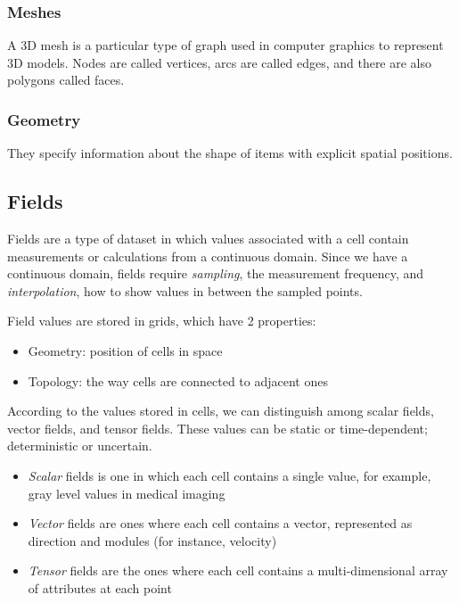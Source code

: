 \subsubsection{Meshes}
A 3D mesh is a particular type of graph used in computer graphics to represent 3D models. Nodes are called vertices, arcs are called edges, and there are also polygons called faces.

\subsubsection{Geometry}
They specify information about the shape of items with explicit spatial positions. 

\subsection{Fields}
Fields are a type of dataset in which values associated with a cell contain measurements or calculations from a continuous domain. Since we have a continuous domain, fields require \emph{sampling}, the measurement frequency, and \emph{interpolation}, how to show values in between the sampled points. \par
Field values are stored in grids, which have 2 properties:

\begin{itemize}[noitemsep]
    \item Geometry: position of cells in space
    \item Topology: the way cells are connected to adjacent ones
\end{itemize}

According to the values stored in cells, we can distinguish among scalar fields, vector fields, and tensor fields. These values can be static or time-dependent; deterministic or uncertain. \par

\begin{itemize}[noitemsep]
    \item \emph{Scalar} fields is one in which each cell contains a single value, for example, gray level values in medical imaging
    \item \emph{Vector} fields are ones where each cell contains a vector, represented as direction and modules (for instance, velocity)
    \item \emph{Tensor} fields are the ones where each cell contains a multi-dimensional array of attributes at each point
\end{itemize}

